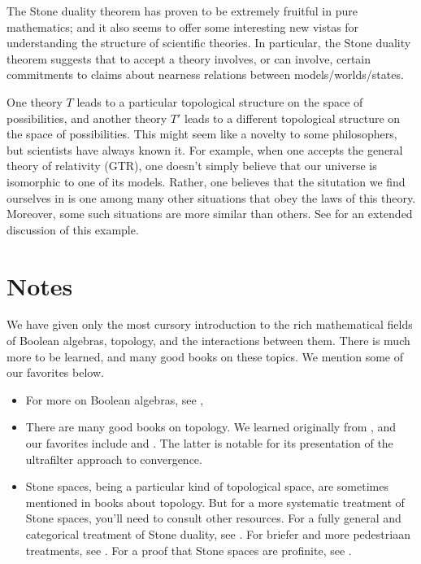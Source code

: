 \begin{disc} The Stone duality theorem has proven to be extremely
  fruitful in pure mathematics; and it also seems to offer some
  interesting new vistas for understanding the structure of scientific
  theories.  In particular, the Stone duality theorem suggests that to
  accept a theory involves, or can involve, certain commitments to
  claims about nearness relations between models/worlds/states.

  One theory $T$ leads to a particular topological structure on the
  space of possibilities, and another theory $T'$ leads to a different
  topological structure on the space of possibilities.  This might
  seem like a novelty to some philosophers, but scientists have always
  known it.  For example, when one accepts the general theory of
  relativity (GTR), one doesn't simply believe that our universe is
  isomorphic to one of its models.  Rather, one believes that the
  situtation we find ourselves in is one among many other situations
  that obey the laws of this theory.  Moreover, some such situations
  are more similar than others.  See \cite{fletcher} for an extended
  discussion of this example.
\end{disc}


\section{Notes}

We have given only the most cursory introduction to the rich
mathematical fields of Boolean algebras, topology, and the
interactions between them.  There is much more to be learned, and many
good books on these topics.  We mention some of our favorites below.

\begin{itemize}
\item For more on Boolean algebras, see
  \cite{sikorski-boo,dwinger,koppelberg,halmos,monk},
\item There are many good books on topology.  We learned originally
  from \cite{munkres}, and our favorites include \cite{engelking} and
  \cite{willard}.  The latter is notable for its presentation of the
  ultrafilter approach to convergence.
\item Stone spaces, being a particular kind of topological space, are
  sometimes mentioned in books about topology.  But for a more
  systematic treatment of Stone spaces, you'll need to consult other
  resources.  For a fully general and categorical treatment of Stone
  duality, see \cite{john-stone}.  For briefer and more pedestriaan
  treatments, see \cite{bell-machover,halmos1998,cori}.  For a proof
  that Stone spaces are profinite, see \cite{ribes}.
\end{itemize}







